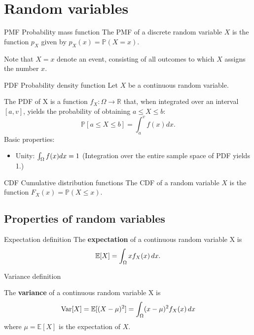 \section{Random variables}

\begin{fact}{PMF \g Probability mass function}{}
    The PMF of a discrete random variable $X$ is the function $p_X$ given by $p_X(x) = \mathbb{P}(X=x)$.
    
    Note that $X=x$ denote an event, consisting of all outcomes to which $X$ assigns the number $x$.
\end{fact}


\begin{fact}{PDF \g Probability density function}{}
  Let $X$ be a continuous random variable.

  The PDF of X is a function $f_X:\Omega\rightarrow\mathbb{R}$ that, when integrated
  over an interval $[a,v]$, yields the probability of obtaining $a\le X \le b$:
  \begin{equation*}
    \mathbb{P}[a\le X \le b] = \int_{a}^{v}f(x)dx.
  \end{equation*}
  Basic properties:
  \begin{itemize}
    \item Unity: $\int_\Omega f(x)dx=1$ (Integration over the entire sample space of PDF yields 1.)
  \end{itemize}
\end{fact}

\begin{fact}{CDF \g Cumulative distribution functions}{}
    The CDF of a random variable $X$ is the function $F_X(x)=\mathbb{P}(X\le x)$.
\end{fact}

\subsection{Properties of random variables}

\begin{fact}{Expectation definition}{}
    The \textbf{expectation} of a continuous random variable X is
    \begin{equation*}
        \mathbb{E}[X] = \int_{\Omega}xf_X(x)\,dx.
    \end{equation*}
\end{fact}

\begin{fact}{Variance definition}{}
    
    The \textbf{variance} of a continuous random variable X is
    \begin{equation*}
        \mathrm{Var}[X] = \mathbb{E}[(X-\mu)^2]=\int_{\Omega}(x-\mu)^2f_X(x)\,dx
    \end{equation*}
    where $\mu=\mathbb{E}[X]$ is the expectation of $X$.
\end{fact}

